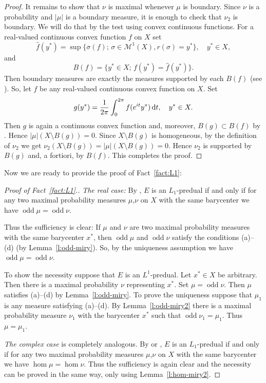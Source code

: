 \documentclass{amsart}
\numberwithin{equation}{section}
\theoremstyle{definition}
\def\M{\mathcal M}
\def\hom{\operatorname{hom}}
\def\odd{\operatorname{odd}}
\def\di{\,\mbox{\rm d}}
\newcommand{\abs}[1]{\left| #1  \right|}
\newcommand{\setsep}{;\,}
\begin{document}
\begin{proof}
It remains to show that $\nu$ is maximal whenever $\mu$ is boundary. Since $\nu$ is a probability and $\abs{\mu}$ is a boundary measure, it is enough to check that $\nu_2$ is boundary. We will do that by the test using convex continuous functions. For a real-valued continuous convex function  $f$ on $X$ set
$$\hat{f}(y^*)=\sup\{\sigma(f)\setsep\sigma\in\M^1(X), r(\sigma)=y^*\}, \quad y^*\in X,$$ and
$$B(f)=\{y^*\in X\setsep f(y^*)=\hat{f}(y^*)\}.$$ Then boundary measures are exactly the measures supported by each $B(f)$ (see \cite[p. 34--35]{alfsen}). So, let $f$ be any real-valued continuous convex function on $X$. Set $$g(y^*)=\frac1{2\pi}\int_0^{2\pi} f(e^{it}y^*)\di t, \quad y^*\in X.$$
 Then $g$ is again a continuous convex function and, moreover, $B(g)\subset B(f)$ by \cite[Lemma 4.1]{effros}. Hence $\abs{\mu}(X\setminus B(g))=0$. Since $X\setminus B(g)$ is homogeneous, by the definition of $\nu_2$ we get $\nu_2(X\setminus B(g))=\abs{\mu}(X\setminus B(g))=0$. Hence $\nu_2$ is supported by $B(g)$ and, a fortiori, by $B(f)$. This completes the proof.
 \end{proof}

Now we are ready to provide the proof of Fact~\ref{fact:L1}:

\begin{proof}[Proof of Fact~\ref{fact:L1}.] \textit{{The real case:}} By \cite[\S 21, Theorem 7]{lacey}, $E$ is an
$L_1$-predual if and only if for any two maximal probability measures $\mu$,$\nu$ on $X$ with the same barycenter we have $\odd\mu=\odd\nu$.

Thus the sufficiency is clear: If $\mu$ and $\nu$ are two maximal probability measures with the same barycenter $x^*$, then $\odd\mu$ and $\odd\nu$ satisfy the conditions (a)--(d) (by Lemma~\ref{l:odd-miry}). So, by the uniqueness assumption we have $\odd\mu=\odd\nu$.

To show the necessity suppose that $E$ is an $L^1$-predual. Let $x^*\in X$ be arbitrary. Then there is a maximal probability $\nu$ representing $x^*$.
Set $\mu=\odd\nu$. Then $\mu$ satisfies (a)--(d) by Lemma~\ref{l:odd-miry}. To prove the uniqueness suppose that $\mu_1$ is any measure satisfying (a)--(d). By Lemma~\ref{l:odd-miry2} there is a maximal probability measure $\nu_1$ with  the barycenter $x^*$ such that $\odd\nu_1=\mu_1$.
Thus $\mu=\mu_1$.	

\textit{The complex case} is completely analogous. By \cite[Theorem 4.3]{effros} or \cite[\S 23, Theorem 5]{lacey}, $E$ is an $L_1$-predual if and only if for any two maximal probability measures $\mu$,$\nu$ on $X$ with the same barycenter we have $\hom\mu=\hom\nu$. Thus the sufficiency is again clear and the necessity can be proved in the same way, only using Lemma~\ref{l:hom-miry2}.

\end{proof}
\end{document}
